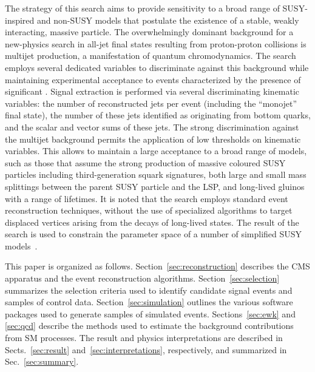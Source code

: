 The strategy of this search aims to provide sensitivity to a broad
range of SUSY-inspired and non-SUSY models that postulate the
existence of a stable, weakly interacting, massive particle. The
overwhelmingly dominant background for a new-physics search in all-jet
final states resulting from proton-proton collisions is multijet
production, a manifestation of quantum chromodynamics. The search
employs several dedicated variables to discriminate against this
background while maintaining experimental acceptance to events
characterized by the presence of significant \ptvecmiss. Signal
extraction is performed via several discriminating kinematic
variables: the number of reconstructed jets per event (including the
``monojet'' final state), the number of these jets identified as
originating from bottom quarks, and the scalar and vector \pt sums of
these jets. The strong discrimination against the multijet background
permits the application of low thresholds on kinematic variables. This
allows to maintain a large acceptance to a broad range of models, such
as those that assume the strong production of massive coloured SUSY
particles including third-generation squark signatures, both large and
small mass splittings between the parent SUSY particle and the LSP,
and long-lived gluinos with a range of lifetimes. It is noted that the
search employs standard event reconstruction techniques, without the
use of specialized algorithms to target displaced vertices arising
from the decays of long-lived states. The result of the search is used
to constrain the parameter space of a number of simplified SUSY
models~\cite{Alwall:2008ag, Alwall:2008va, sms}.

This paper is organized as follows. Section~\ref{sec:reconstruction}
describes the CMS apparatus and the event reconstruction
algorithms. Section~\ref{sec:selection} summarizes the selection
criteria used to identify candidate signal events and samples of
control data. Section~\ref{sec:simulation} outlines the various
software packages used to generate samples of simulated
events. Sections~\ref{sec:ewk} and \ref{sec:qcd} describe the methods
used to estimate the background contributions from SM processes. The
result and physics interpretations are described in
Sects.~\ref{sec:result} and~\ref{sec:interpretations}, respectively,
and summarized in Sec.~\ref{sec:summary}.


